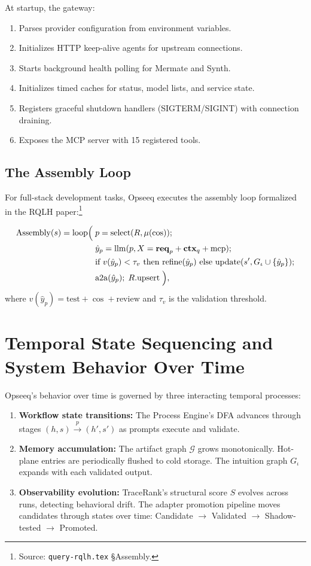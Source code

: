 \documentclass[11pt]{article}
\theoremstyle{remark}
\newcommand{\req}{\mathbf{req}}
\newcommand{\ctxq}{\mathbf{ctx}_q}
\newcommand{\yp}{\hat{y}_p}
\newcommand{\graph}{\mathcal{G}}
\begin{document}
At startup, the gateway:
\begin{enumerate}
  \item Parses provider configuration from environment variables.
  \item Initializes HTTP keep-alive agents for upstream connections.
  \item Starts background health polling for Mermate and Synth.
  \item Initializes timed caches for status, model lists, and service state.
  \item Registers graceful shutdown handlers (SIGTERM/SIGINT) with connection draining.
  \item Exposes the MCP server with 15 registered tools.
\end{enumerate}

\subsection{The Assembly Loop}
\label{subsec:assembly_loop}

For full-stack development tasks, Opseeq executes the assembly loop formalized in the RQLH paper:\footnote{Source: \texttt{query-rqlh.tex} \S Assembly.}

\begin{align*}
\mathrm{Assembly}(s) = \mathrm{loop}\Bigl(\;
  & p = \mathrm{select}(R, \mu(\cos)); \\
  & \yp = \mathrm{llm}(p, X = \req_p + \ctxq + \mathrm{mcp}); \\
  & \text{if } v(\yp) < \tau_v \text{ then refine}(\yp) \text{ else update}(s', G_\iota \cup \{\yp\}); \\
  & \mathrm{a2a}(\yp);\; R.\mathrm{upsert}\;\Bigr),
\end{align*}
where $v(\yp) = \mathrm{test} + \cos + \mathrm{review}$ and $\tau_v$ is the validation threshold.

\section{Temporal State Sequencing and System Behavior Over Time}
\label{sec:temporal}

Opseeq's behavior over time is governed by three interacting temporal processes:

\begin{enumerate}
  \item \textbf{Workflow state transitions:} The Process Engine's DFA advances through stages $(h, s) \xrightarrow{p} (h', s')$ as prompts execute and validate.
  \item \textbf{Memory accumulation:} The artifact graph $\graph$ grows monotonically. Hot-plane entries are periodically flushed to cold storage. The intuition graph $G_\iota$ expands with each validated output.
  \item \textbf{Observability evolution:} TraceRank's structural score $S$ evolves across runs, detecting behavioral drift. The adapter promotion pipeline moves candidates through states over time: Candidate $\to$ Validated $\to$ Shadow-tested $\to$ Promoted.
\end{enumerate}
\end{document}
